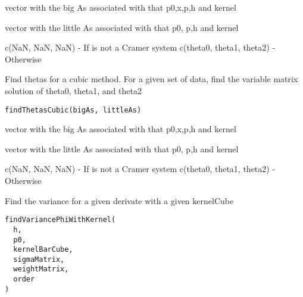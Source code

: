 \documentclass[letterpaper]{book}
\begin{document}
%
\begin{Arguments}
\begin{ldescription}
\item[\code{bigAs}] vector with the big As associated with that p0,x,p,h and kernel

\item[\code{littleAs}] vector with the little As associated with that p0, p,h and kernel
\end{ldescription}
\end{Arguments}
%
\begin{Value}
c(NaN, NaN, NaN) - If is not a Cramer system
c(theta0, theta1, theta2)    - Otherwise
\end{Value}
%
\begin{Description}\relax
Find thetas for a cubic method.
For a given set of data, find the variable matrix solution of theta0, theta1, and theta2
\end{Description}
%
\begin{Usage}
\begin{verbatim}
findThetasCubic(bigAs, littleAs)
\end{verbatim}
\end{Usage}
%
\begin{Arguments}
\begin{ldescription}
\item[\code{bigAs}] vector with the big As associated with that p0,x,p,h and kernel

\item[\code{littleAs}] vector with the little As associated with that p0, p,h and kernel
\end{ldescription}
\end{Arguments}
%
\begin{Value}
c(NaN, NaN, NaN) - If is not a Cramer system
c(theta0, theta1, theta2)    - Otherwise
\end{Value}
%
\begin{Description}\relax
Find the variance for a given derivate with a given kernelCube
\end{Description}
%
\begin{Usage}
\begin{verbatim}
findVariancePhiWithKernel(
  h,
  p0,
  kernelBarCube,
  sigmaMatrix,
  weightMatrix,
  order
)
\end{verbatim}
\end{Usage}
\end{document}
